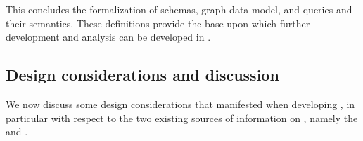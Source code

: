 
This concludes the formalization of \gql schemas, graph data model, and queries and their semantics.  These definitions provide the base upon which further development and analysis can be developed in \gcoql.


\subsection{Design considerations and discussion}\label{subsec:discussion}

We now discuss some design considerations that manifested when developing 
\gcoql, in particular with respect to the two existing sources of information on \gql, namely the \spec and \HP.


